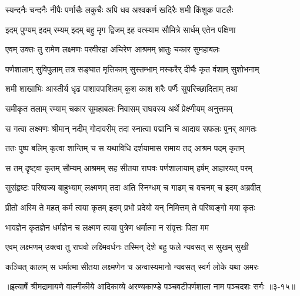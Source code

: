 \twolineshloka
{स्यन्दनैः चन्दनैः नीपैः पर्णासैः लकुचैः अपि}
{धव अश्वकर्ण खदिरैः शमी किंशुक पाटलैः} %

\twolineshloka
{इदम् पुण्यम् इदम् रम्यम् इदम् बहु मृग द्विजम्}
{इह वत्स्याम सौमित्रे सार्धम् एतेन पक्षिणा} %

\twolineshloka
{एवम् उक्तः तु रामेण लक्ष्मणः परवीरहा}
{अचिरेण आश्रमम् भ्रातुः चकार सुमहाबलः} %

\twolineshloka
{पर्णशालाम् सुविपुलाम् तत्र सङ्घात मृत्तिकाम्}
{सुस्तम्भाम् मस्करैर् दीर्घैः कृत वंशाम् सुशोभनाम्} %

\twolineshloka
{शमी शाखाभिः आस्तीर्य धृढ पाशावपाशितम्}
{कुश काश शरैः पर्णैः सुपरिच्छादिताम् तथा} %

\twolineshloka
{समीकृत तलाम् रम्याम् चकार सुमहाबलः}
{निवासम् राघवस्य अर्थे प्रेक्ष्णीयम् अनुत्तमम्} %

\twolineshloka
{स गत्वा लक्ष्मणः श्रीमान् नदीम् गोदावरीम् तदा}
{स्नात्वा पद्मानि च आदाय सफलः पुनर् आगतः} %

\twolineshloka
{ततः पुष्प बलिम् कृत्वा शान्तिम् च स यथाविधि}
{दर्शयामास रामाय तद् आश्रम पदम् कृतम्} %

\twolineshloka
{स तम् दृष्ट्वा कृतम् सौम्यम् आश्रमम् सह सीतया}
{राघवः पर्णशालायाम् हर्षम् आहारयत् परम्} %

\twolineshloka
{सुसंहृष्टः परिष्वज्य बाहुभ्याम् लक्ष्मणम् तदा}
{अति स्निग्धम् च गाढम् च वचनम् च इदम् अब्रवीत्} %

\twolineshloka
{प्रीतो अस्मि ते महत् कर्म त्वया कृतम् इदम् प्रभो}
{प्रदेयो यन् निमित्तम् ते परिष्वङ्गो मया कृतः} %

\twolineshloka
{भावज्ञेन कृतज्ञेन धर्मज्ञेन च लक्ष्मण}
{त्वया पुत्रेण धर्मात्मा न संवृत्तः पिता मम} %

\twolineshloka
{एवम् लक्ष्मणम् उक्त्वा तु राघवो लक्ष्मिवर्धनः}
{तस्मिन् देशे बहु फले न्यवसत् स सुखम् सुखी} %

\onelineshloka
{कञ्चित् कालम् स धर्मात्मा सीतया लक्ष्मणेन च अन्वास्यमानो न्यवसत् स्वर्ग लोके यथा अमरः} %


॥इत्यार्षे श्रीमद्रामायणे वाल्मीकीये आदिकाव्ये अरण्यकाण्डे पञ्चवटीपर्णशाला नाम पञ्चदशः सर्गः ॥३-१५॥
